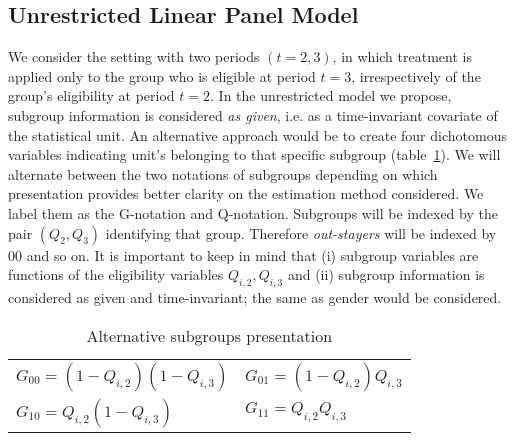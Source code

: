 \documentclass[12pt]{article}
\begin{document}
\subsection{Unrestricted Linear Panel Model}
We consider the setting with two periods $(t=2,3)$, in which treatment is applied only to the group who is eligible at period $t=3$, irrespectively of the group's eligibility at period $t=2$. In the unrestricted model we propose, subgroup information is considered \textit{as given}, i.e. as a time-invariant covariate of the statistical unit. An alternative approach would be to create four dichotomous variables indicating unit's belonging to that specific subgroup (table~\ref{tb:subgroups}). We will alternate between the two notations of subgroups depending on which presentation provides better clarity on the estimation method considered. We label them as the G-notation and Q-notation. Subgroups will be indexed by the pair $(Q_2,Q_3)$ identifying that group. Therefore \textit{out-stayers} will be indexed by $00$ and so on. It is important to keep in mind that (i) subgroup variables are functions of the eligibility variables $Q_{i,2},Q_{i,3}$ and (ii) subgroup information is considered as given and time-invariant; the same as gender would be considered.
\begin{table}[h]
	\centering	
	\caption{Alternative subgroups presentation}
	\label{tb:subgroups}
	\begin{tabular}{ll}
		$G_{00}=(1-Q_{i,2})(1-Q_{i,3})$ & $G_{01}=(1-Q_{i,2})Q_{i,3}$\\
		$G_{10}=Q_{i,2}(1-Q_{i,3})$ & $G_{11}=Q_{i,2}Q_{i,3}$
	\end{tabular}
\end{table} 
\end{document}
